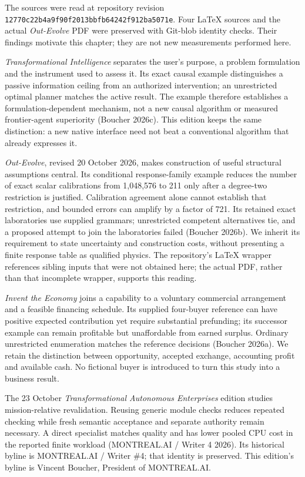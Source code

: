 \documentclass[10pt,letterpaper]{article}
\begin{document}
The sources were read at repository revision
\nolinkurl{12770c22b4a9f90f2013bbfb64242f912ba5071e}. Four LaTeX sources
and the actual \emph{Out-Evolve} PDF were preserved with Git-blob
identity checks. Their findings motivate this chapter; they are not new
measurements performed here.

\emph{Transformational Intelligence} separates the user's purpose, a
problem formulation and the instrument used to assess it. Its exact
causal example distinguishes a passive information ceiling from an
authorized intervention; an unrestricted optimal planner matches the
active result. The example therefore establishes a formulation-dependent
mechanism, not a new causal algorithm or measured frontier-agent
superiority (Boucher 2026c). This edition keeps the same distinction: a
new native interface need not beat a conventional algorithm that already
expresses it.

\emph{Out-Evolve}, revised 20 October 2026, makes construction of useful
structural assumptions central. Its conditional response-family example
reduces the number of exact scalar calibrations from 1,048,576 to 211
only after a degree-two restriction is justified. Calibration agreement
alone cannot establish that restriction, and bounded errors can amplify
by a factor of 721. Its retained exact laboratories use supplied
grammars; unrestricted competent alternatives tie, and a proposed
attempt to join the laboratories failed (Boucher 2026b). We inherit its
requirement to state uncertainty and construction costs, without
presenting a finite response table as qualified physics. The
repository's LaTeX wrapper references sibling inputs that were not
obtained here; the actual PDF, rather than that incomplete wrapper,
supports this reading.

\emph{Invent the Economy} joins a capability to a voluntary commercial
arrangement and a feasible financing schedule. Its supplied four-buyer
reference can have positive expected contribution yet require
substantial prefunding; its successor example can remain profitable but
unaffordable from earned surplus. Ordinary unrestricted enumeration
matches the reference decisions (Boucher 2026a). We retain the
distinction between opportunity, accepted exchange, accounting profit
and available cash. No fictional buyer is introduced to turn this study
into a business result.

The 23 October \emph{Transformational Autonomous Enterprises} edition
studies mission-relative revalidation. Reusing generic module checks
reduces repeated checking while fresh semantic acceptance and separate
authority remain necessary. A direct specialist matches quality and has
lower pooled CPU cost in the reported finite workload (MONTREAL.AI /
Writer 4 2026). Its historical byline is MONTREAL.AI / Writer \#4; that
identity is preserved. This edition's byline is Vincent Boucher,
President of MONTREAL.AI.
\end{document}
